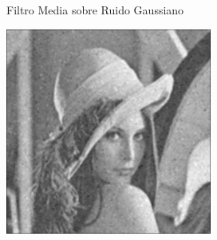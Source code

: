\documentclass{beamer}
\begin{document}
\begin{frame}[fragile]{Filtro Media sobre Ruido Gaussiano}
\begin{minipage}{0.25\linewidth}
	\end{minipage}\hfill
	\begin{minipage}{0.25\linewidth}
		\centering
		\includegraphics[width=\linewidth]{../results/lena_gauss_sigma50_media}
	\end{minipage}
\end{frame}
\end{document}
